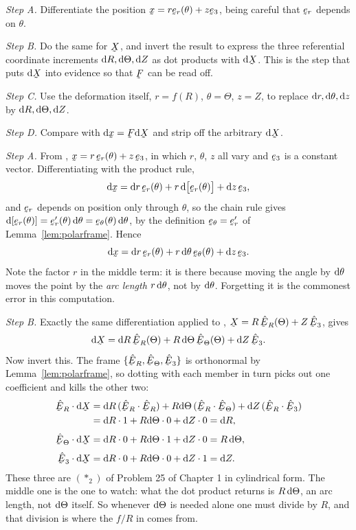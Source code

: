 \smallskip
\emph{Step A.} Differentiate the position $\bx=r\ber(\theta)+z\be_{3}$,
being careful that $\ber$ depends on $\theta$.

\emph{Step B.} Do the same for $\bX$, and invert the result to express the
three referential coordinate increments $\mathrm{d} R,\mathrm{d}\Theta,\mathrm{d} Z$ as dot
products with $\dl\bX$. This is the step that puts $\dl\bX$ into evidence
so that $\bF$ can be read off.

\emph{Step C.} Use the deformation itself, $r=f(R)$, $\theta=\Theta$,
$z=Z$, to replace $\mathrm{d} r,\mathrm{d}\theta,\mathrm{d} z$ by $\mathrm{d} R,\mathrm{d}\Theta,\mathrm{d} Z$.

\emph{Step D.} Compare with $\dl\bx=\bF\dl\bX$ and strip off the arbitrary
$\dl\bX$.

\smallskip
\emph{Step A.} From , $\bx=r\,\ber(\theta)+z\,\be_{3}$, in which
$r$, $\theta$, $z$ all vary and $\be_{3}$ is a constant vector.
Differentiating with the product rule,
\[
   \dl\bx=\dl r\,\ber(\theta)+r\,\dl\big[\ber(\theta)\big]+\dl z\,\be_{3},
\]
and $\ber$ depends on position only through $\theta$, so the chain rule
gives $\dl[\ber(\theta)]=\ber'(\theta)\,\dl\theta=\bet(\theta)\,\dl\theta$,
by the definition $\bet=\ber'$ of Lemma~\ref{lem:polarframe}. Hence
\[
   \dl\bx=\dl r\,\ber(\theta)+r\,\dl\theta\,\bet(\theta)+\dl z\,\be_{3}.
\]
Note the factor $r$ in the middle term: it is there because moving the
angle by $\mathrm{d}\theta$ moves the point by the \emph{arc length}
$r\,\mathrm{d}\theta$, not by $\mathrm{d}\theta$. Forgetting it is the commonest error in
this computation.

\smallskip
\emph{Step B.} Exactly the same differentiation applied to ,
$\bX=R\,\hER(\Theta)+Z\,\hbE_{3}$, gives
\[
   \dl\bX=\dl R\,\hER(\Theta)+R\,\dl\Theta\,\hETh(\Theta)+\dl Z\,\hbE_{3}.
\]
Now invert this. The frame $\{\hER,\hETh,\hbE_{3}\}$ is orthonormal by
Lemma~\ref{lem:polarframe}, so dotting with each member in turn picks out
one coefficient and kills the other two:
\[
\begin{aligned}
   \ip{\hER}{\dl\bX}&=\dl R\,(\ip{\hER}{\hER})
     +R\dl\Theta\,(\ip{\hER}{\hETh})+\dl Z\,(\ip{\hER}{\hbE_{3}})\\
   &=\dl R\cdot1+R\dl\Theta\cdot0+\dl Z\cdot0=\dl R,\\[1mm]
   \ip{\hETh}{\dl\bX}&=\dl R\cdot0+R\dl\Theta\cdot1+\dl Z\cdot0
     =R\,\dl\Theta,\\[1mm]
   \ip{\hbE_{3}}{\dl\bX}&=\dl R\cdot0+R\dl\Theta\cdot0+\dl Z\cdot1
     =\dl Z .
\end{aligned}
\]
These three are $(\ast_{2})$ of Problem 25 of Chapter 1 in cylindrical
form. The middle one is the one to watch: what the dot product returns is
$R\,\mathrm{d}\Theta$, an arc length, not $\mathrm{d}\Theta$ itself. So whenever
$\mathrm{d}\Theta$ is needed alone one must divide by $R$, and that division is
where the $f/R$ in  comes from.

